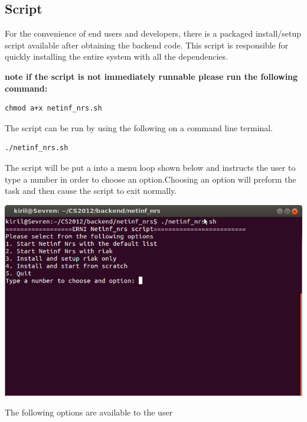 \subsection{Script}
\label{backend-install-script}
For the convenience of end users and developers, there is a packaged install/setup script available after obtaining the backend code. This script is responsible for quickly installing the entire system with all the dependencies.

\textbf{note if the script is not immediately runnable please run the following command:}
\begin{verbatim}
chmod a+x netinf_nrs.sh
\end{verbatim}

The script can be run by using the following on a command line terminal.

\begin{verbatim}
./netinf_nrs.sh
\end{verbatim}

The script will be put a into a menu loop shown below and instructs the user to type a number in order to choose an option.Choosing an option will preform the task and then cause the script to exit normally.

\includegraphics[scale=0.5]{./img/Backend_install_script.png}

The following options are available to the user

